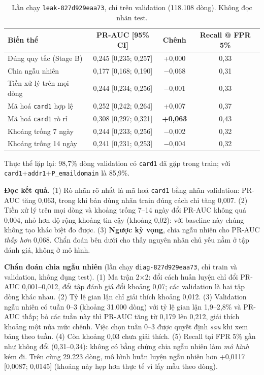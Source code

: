 \documentclass[11pt,a4paper]{article}
\newcommand{\code}[1]{\texttt{\small #1}}
\begin{document}
\begin{table}[H]\centering
\caption{Lần chạy \code{leak-827d929eaa73}, chỉ trên validation (118.108 dòng). Không đọc nhãn test.}
\begin{tabular}{@{}lccc@{}}
\toprule
Biến thể & PR-AUC [95\% CI] & Chênh & Recall @ FPR 5\% \\ \midrule
Đúng quy tắc (Stage B) & 0,245 [0,235; 0,257] & +0,000 & 0,33 \\
Chia ngẫu nhiên & 0,177 [0,168; 0,190] & $-$0,068 & 0,31 \\
Tiền xử lý trên mọi dòng & 0,244 [0,234; 0,256] & $-$0,001 & 0,33 \\
Mã hoá \code{card1} hợp lệ & 0,252 [0,242; 0,264] & +0,007 & 0,37 \\
Mã hoá \code{card1} rò rỉ & 0,308 [0,297; 0,321] & \textbf{+0,063} & 0,43 \\
Khoảng trống 7 ngày & 0,244 [0,233; 0,256] & $-$0,002 & 0,32 \\
Khoảng trống 14 ngày & 0,241 [0,231; 0,253] & $-$0,004 & 0,32 \\ \bottomrule
\end{tabular}
\end{table}

Thực thể lặp lại: 98,7\% dòng validation có \code{card1} đã gặp trong train; với \code{card1}+\code{addr1}+\code{P\_emaildomain} là 85,9\%.

\begin{keypoint}
\textbf{Đọc kết quả.} (1) Rò nhãn rõ nhất là mã hoá \code{card1} bằng nhãn validation: PR-AUC tăng 0,063, trong khi bản dùng nhãn train đúng cách chỉ tăng 0,007. (2) Tiền xử lý trên mọi dòng và khoảng trống 7--14 ngày đổi PR-AUC không quá 0,004, nhỏ hơn độ rộng khoảng tin cậy (khoảng 0,02): với baseline này chúng không tạo khác biệt đo được. (3) \textbf{Ngược kỳ vọng}, chia ngẫu nhiên cho PR-AUC \emph{thấp hơn} 0,068. Chẩn đoán bên dưới cho thấy nguyên nhân chủ yếu nằm ở tập đánh giá, không ở mô hình.
\end{keypoint}

\begin{keypoint}
\textbf{Chẩn đoán chia ngẫu nhiên} (lần chạy \code{diag-827d929eaa73}, chỉ train và validation, không đụng test). (1) Ma trận 2$\times$2: đổi cách huấn luyện chỉ đổi PR-AUC 0,001--0,012, đổi tập đánh giá đổi khoảng 0,07; các validation là hai tập dòng khác nhau. (2) Tỷ lệ gian lận chỉ giải thích khoảng 0,012. (3) Validation ngẫu nhiên có tuần 0--3 (khoảng 31.000 dòng) với tỷ lệ gian lận 1,9--2,8\% và PR-AUC thấp; bỏ các tuần này thì PR-AUC tăng từ 0,179 lên 0,212, giải thích khoảng một nửa mức chênh. Việc chọn tuần 0--3 được quyết định \emph{sau} khi xem bảng theo tuần. (4) Còn khoảng 0,03 chưa giải thích. (5) Recall tại FPR 5\% gần như không đổi (0,31--0,34): không có bằng chứng chia ngẫu nhiên làm \emph{mô hình} kém đi. Trên cùng 29.223 dòng, mô hình huấn luyện ngẫu nhiên hơn +0,0117 [0,0087; 0,0145] (khoảng này hẹp hơn thực tế vì lấy mẫu theo dòng).
\end{keypoint}
\end{document}
